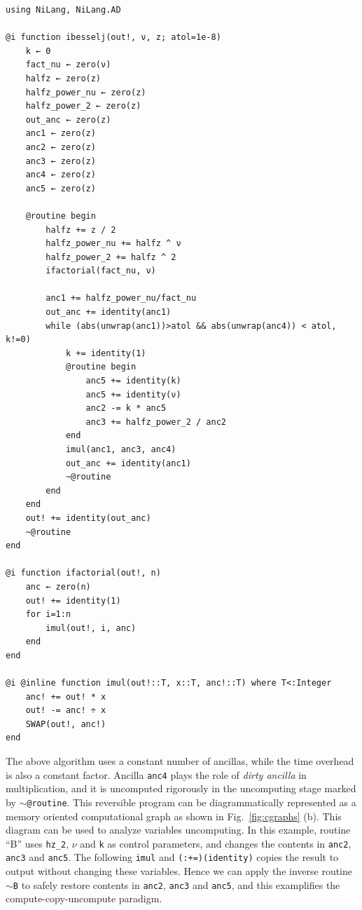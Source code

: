 \documentclass{article}
\newcommand{\<}{\langle}
\renewcommand{\>}{\rangle}
\newcommand{\Fig}[1]{Fig.~\ref{#1}}
\theoremstyle{definition}\newtheorem{definition}{\textit{Definition}}
\begin{document}
\begin{minipage}{\columnwidth}
\begin{lstlisting}[multicols=2]
using NiLang, NiLang.AD

@i function ibesselj(out!, ν, z; atol=1e-8)
    k ← 0
    fact_nu ← zero(ν)
    halfz ← zero(z)
    halfz_power_nu ← zero(z)
    halfz_power_2 ← zero(z)
    out_anc ← zero(z)
    anc1 ← zero(z)
    anc2 ← zero(z)
    anc3 ← zero(z)
    anc4 ← zero(z)
    anc5 ← zero(z)

    @routine begin
        halfz += z / 2
        halfz_power_nu += halfz ^ ν
        halfz_power_2 += halfz ^ 2
        ifactorial(fact_nu, ν)

        anc1 += halfz_power_nu/fact_nu
        out_anc += identity(anc1)
        while (abs(unwrap(anc1))>atol && abs(unwrap(anc4)) < atol, k!=0)
            k += identity(1)
            @routine begin
                anc5 += identity(k)
                anc5 += identity(ν)
                anc2 -= k * anc5
                anc3 += halfz_power_2 / anc2
            end
            imul(anc1, anc3, anc4)
            out_anc += identity(anc1)
            ~@routine
        end
    end
    out! += identity(out_anc)
    ~@routine
end

@i function ifactorial(out!, n)
    anc ← zero(n)
    out! += identity(1)
    for i=1:n
        imul(out!, i, anc)
    end
end

@i @inline function imul(out!::T, x::T, anc!::T) where T<:Integer
    anc! += out! * x
    out! -= anc! ÷ x
    SWAP(out!, anc!)
end
\end{lstlisting}
\end{minipage}

The above algorithm uses a constant number of ancillas, while the time overhead is also a constant factor.
Ancilla \texttt{anc4} plays the role of \textit{dirty ancilla} in multiplication, and it is uncomputed rigorously in the uncomputing stage marked by \texttt{$\sim$@routine}.
This reversible program can be diagrammatically represented as a memory oriented computational graph as shown in \Fig{fig:cgraphs} (b).
This diagram can be used to analyze variables uncomputing. In this example, routine ``B'' uses \texttt{hz\_2}, \texttt{$\nu$} and \texttt{k} as control parameters, and changes the contents in \texttt{anc2}, \texttt{anc3} and \texttt{anc5}.
The following \texttt{imul} and \texttt{(:+=)(identity)} copies the result to output without changing these variables.
Hence we can apply the inverse routine \texttt{$\sim$B} to safely restore contents in \texttt{anc2}, \texttt{anc3} and \texttt{anc5}, and this examplifies the compute-copy-uncompute paradigm.
\end{document}
